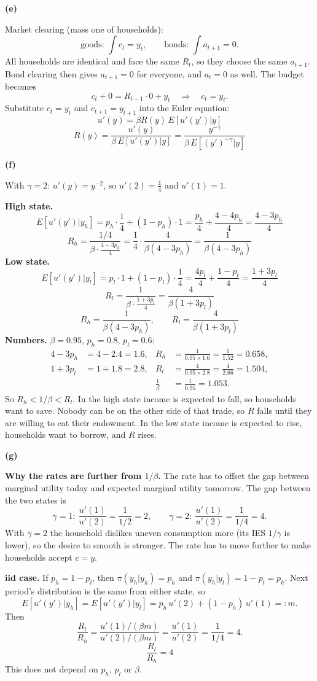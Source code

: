 \documentclass[12pt]{article}
\newcommand{\E}{E}
\newcommand{\pt}[1]{\par\bigskip\textbf{(#1)}\par}
\newcommand{\ans}[1]{\[\boxed{\ #1\ }\]}
\begin{document}
\pt{e}
Market clearing (mass one of households):
\[
\text{goods: }\int c_t=y_t,\qquad\text{bonds: }\int a_{t+1}=0 .
\]
All households are identical and face the same $R_t$, so they choose the
same $a_{t+1}$. Bond clearing then gives $a_{t+1}=0$ for everyone, and
$a_t=0$ as well. The budget becomes
\[
c_t+0=R_{t-1}\cdot0+y_t\quad\Longrightarrow\quad c_t=y_t .
\]
Substitute $c_t=y_t$ and $c_{t+1}=y_{t+1}$ into the Euler equation:
\[
u'(y)=\beta R(y)\,\E[u'(y')|y]
\]
\ans{R(y)=\frac{u'(y)}{\beta\,\E[u'(y')|y]}=\frac{y^{-\gamma}}{\beta\,\E[(y')^{-\gamma}|y]}}

\pt{f}
With $\gamma=2$: $u'(y)=y^{-2}$, so $u'(2)=\frac{1}{4}$ and $u'(1)=1$.

\textbf{High state.}
\[
\E[u'(y')|y_h]=p_h\cdot\frac14+(1-p_h)\cdot1=\frac{p_h}{4}+\frac{4-4p_h}{4}=\frac{4-3p_h}{4}
\]
\[
R_h=\frac{1/4}{\beta\cdot\frac{4-3p_h}{4}}=\frac{1}{4}\cdot\frac{4}{\beta(4-3p_h)}=\frac{1}{\beta(4-3p_h)}
\]
\textbf{Low state.}
\[
\E[u'(y')|y_l]=p_l\cdot1+(1-p_l)\cdot\frac14=\frac{4p_l}{4}+\frac{1-p_l}{4}=\frac{1+3p_l}{4}
\]
\[
R_l=\frac{1}{\beta\cdot\frac{1+3p_l}{4}}=\frac{4}{\beta(1+3p_l)}
\]
\ans{R_h=\frac{1}{\beta(4-3p_h)},\qquad R_l=\frac{4}{\beta(1+3p_l)}}
\textbf{Numbers.} $\beta=0.95$, $p_h=0.8$, $p_l=0.6$:
\begin{align*}
4-3p_h&=4-2.4=1.6, & R_h&=\frac{1}{0.95\times1.6}=\frac{1}{1.52}=0.658,\\
1+3p_l&=1+1.8=2.8, & R_l&=\frac{4}{0.95\times2.8}=\frac{4}{2.66}=1.504,\\
&& \frac1\beta&=\frac{1}{0.95}=1.053 .
\end{align*}
So $R_h<1/\beta<R_l$. In the high state income is expected to fall, so
households want to save. Nobody can be on the other side of that trade, so
$R$ falls until they are willing to eat their endowment. In the low state
income is expected to rise, households want to borrow, and $R$ rises.

\pt{g}
\textbf{Why the rates are further from $1/\beta$.} The rate has to offset
the gap between marginal utility today and expected marginal utility
tomorrow. The gap between the two states is
\[
\gamma=1:\ \frac{u'(1)}{u'(2)}=\frac{1}{1/2}=2,\qquad\gamma=2:\ \frac{u'(1)}{u'(2)}=\frac{1}{1/4}=4 .
\]
With $\gamma=2$ the household dislikes uneven consumption more (its IES
$1/\gamma$ is lower), so the desire to smooth is stronger. The rate has to
move further to make households accept $c=y$.

\textbf{iid case.} If $p_h=1-p_l$, then $\pi(y_h|y_h)=p_h$ and
$\pi(y_h|y_l)=1-p_l=p_h$. Next period's distribution is the same from
either state, so
\[
\E[u'(y')|y_h]=\E[u'(y')|y_l]=p_h\,u'(2)+(1-p_h)\,u'(1)=:m .
\]
Then
\[
\frac{R_l}{R_h}=\frac{u'(1)/(\beta m)}{u'(2)/(\beta m)}=\frac{u'(1)}{u'(2)}=\frac{1}{1/4}=4 .
\]
\ans{\frac{R_l}{R_h}=4}
This does not depend on $p_h$, $p_l$ or $\beta$.
\end{document}
